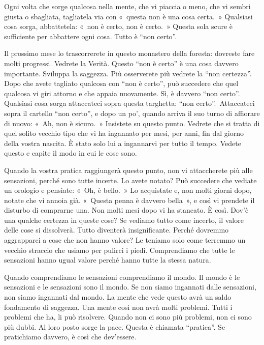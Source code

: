 Ogni volta che sorge qualcosa nella mente, che vi piaccia o meno, che vi
sembri giusta o sbagliata, tagliatela via con «~questa non è una cosa
certa.~» Qualsiasi cosa sorga, abbattetela: «~non è certo, non è
certo.~» Questa sola scure è sufficiente per abbattere ogni cosa. Tutto
è ``non certo''.

Il prossimo mese lo trascorrerete in questo monastero della foresta:
dovreste fare molti progressi. Vedrete la Verità. Questo ``non è certo''
è una cosa davvero importante. Sviluppa la saggezza. Più osserverete più
vedrete la ``non certezza''. Dopo che avete tagliato qualcosa con ``non
è certo'', può succedere che quel qualcosa vi giri attorno e che appaia
nuovamente. Sì, è davvero ``non certo''. Qualsiasi cosa sorga
attaccateci sopra questa targhetta: ``non certo''.~Attaccateci sopra il
cartello ``non certo'', e dopo un po', quando arriva il suo turno di
affiorare di nuovo: «~Ah, non è sicuro.~» Insistete su questo punto.
Vedrete che si tratta di quel solito vecchio tipo che vi ha ingannato
per mesi, per anni, fin dal giorno della vostra nascita. È stato solo
lui a ingannarvi per tutto il tempo. Vedete questo e capite il modo in
cui le cose sono.

Quando la vostra pratica raggiungerà questo punto, non vi attaccherete
più alle sensazioni, perché sono tutte incerte. Lo avete notato? Può
succedere che vediate un orologio e pensiate: «~Oh, è bello.~» Lo
acquistate e, non molti giorni dopo, notate che vi annoia già. «~Questa
penna è davvero bella~», e così vi prendete il disturbo di comprarne
una. Non molti mesi dopo vi ha stancato. È così. Dov'è una qualche
certezza in queste cose? Se vediamo tutto come incerto, il valore delle
cose si dissolverà. Tutto diventerà insignificante. Perché dovremmo
aggrapparci a cose che non hanno valore? Le teniamo solo come terremmo
un vecchio straccio che usiamo per pulirci i piedi. Comprendiamo che
tutte le sensazioni hanno ugual valore perché hanno tutte la stessa
natura.

Quando comprendiamo le sensazioni comprendiamo il mondo. Il mondo è le
sensazioni e le sensazioni sono il mondo. Se non siamo ingannati dalle
sensazioni, non siamo ingannati dal mondo. La mente che vede questo avrà
un saldo fondamento di saggezza. Una mente così non avrà molti problemi.
Tutti i problemi che ha, li può risolvere. Quando non ci sono più
problemi, non ci sono più dubbi. Al loro posto sorge la pace. Questa è
chiamata ``pratica''. Se pratichiamo davvero, è così che dev'essere.

